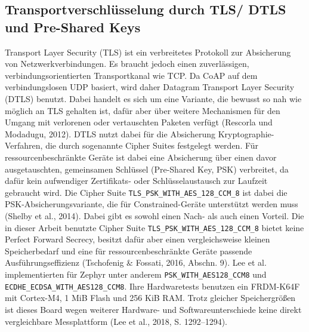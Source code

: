\subsection{Transportverschl{\"u}sselung durch TLS/ DTLS und Pre-Shared Keys}
Transport Layer Security (TLS) ist ein verbreitetes Protokoll zur Absicherung von Netzwerkverbindungen. Es braucht jedoch einen zuverl{\"a}ssigen, verbindungsorientierten Transportkanal wie TCP. Da CoAP auf dem verbindungslosen UDP basiert, wird daher Datagram Transport Layer Security (DTLS) benutzt. Dabei handelt es sich um eine Variante, die bewusst so nah wie m{\"o}glich an TLS gehalten ist, daf{\"u}r aber {\"u}ber weitere Mechanismen f{\"u}r den Umgang mit verlorenen oder vertauschten Paketen verf{\"u}gt (Rescorla und Modadugu, 2012). DTLS nutzt dabei f{\"u}r die Absicherung Kryptographie-Verfahren, die durch sogenannte Cipher Suites festgelegt werden. F{\"u}r ressourcenbeschr{\"a}nkte Ger{\"a}te ist dabei eine Absicherung {\"u}ber einen davor ausgetauschten, gemeinsamen Schl{\"u}ssel (Pre-Shared Key, PSK) verbreitet, da daf{\"u}r kein aufwendiger Zertifikats- oder Schl{\"u}sselaustausch zur Laufzeit gebraucht wird. Die Cipher Suite \lstinline[style=fileinline]|TLS_PSK_WITH_AES_128_CCM_8| ist dabei die PSK-Absicherungsvariante, die f{\"u}r Constrained-Ger{\"a}te unterst{\"u}tzt werden muss (Shelby et al., 2014). Dabei gibt es sowohl einen Nach- als auch einen Vorteil. Die in dieser Arbeit benutzte Cipher Suite \lstinline[style=fileinline]|TLS_PSK_WITH_AES_128_CCM_8| bietet keine Perfect Forward Secrecy, besitzt daf{\"u}r aber einen vergleichsweise kleinen Speicherbedarf und eine f{\"u}r ressourcenbeschr{\"a}nkte Ger{\"a}te passende Ausf{\"u}hrungseffizienz (Tschofenig \& Fossati, 2016, Abschn. 9). Lee et al. implementierten f{\"u}r Zephyr unter anderem \lstinline[style=fileinline]|PSK_WITH_AES128_CCM8| und \lstinline[style=fileinline]|ECDHE_ECDSA_WITH_AES128_CCM8|. Ihre Hardwaretests benutzen ein FRDM-K64F mit Cortex-M4, 1 MiB Flash und 256 KiB RAM. Trotz gleicher Speichergr{\"o}{\ss}en ist dieses Board wegen weiterer Hardware- und Softwareunterschiede keine direkt vergleichbare Messplattform (Lee et al., 2018, S. 1292--1294).

